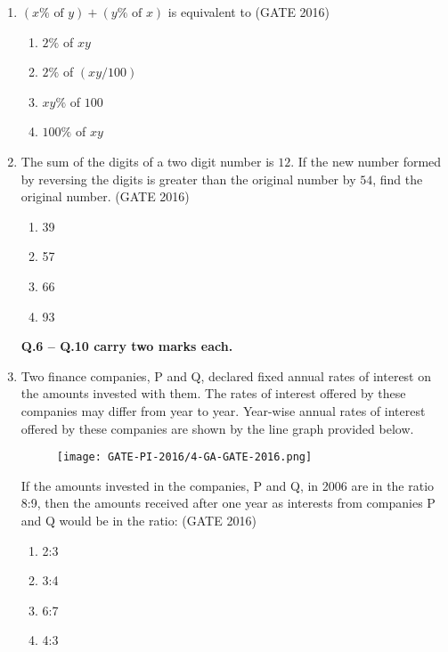 \documentclass[journal,12pt,onecolumn]{IEEEtran}
\theoremstyle{remark}
\begin{document}
\begin{enumerate}
\item $(x\% \text{ of } y) + (y\% \text{ of } x)$ is equivalent to \underline{\hspace{2cm}}  
\hfill{(GATE 2016)}

\begin{enumerate}
    \item $2\%$ of $xy$
    \item $2\%$ of $(xy/100)$
    \item $xy\%$ of $100$
    \item $100\%$ of $xy$
\end{enumerate}
\vspace{1cm}

\item The sum of the digits of a two digit number is $12$. If the new number formed by reversing the digits is greater than the original number by $54$, find the original number.  
\hfill{(GATE 2016)}

\begin{enumerate}
    \item 39
    \item 57
    \item 66
    \item 93
\end{enumerate}
\vspace{1cm}

\textbf{Q.6 -- Q.10 carry two marks each.}



\item Two finance companies, P and Q, declared fixed annual rates of interest on the amounts invested with them. The rates of interest offered by these companies may differ from year to year. Year-wise annual rates of interest offered by these companies are shown by the line graph provided below.  

\begin{figure}[h!]
    \centering
    \texttt{[image: GATE-PI-2016/4-GA-GATE-2016.png]} %
\end{figure}

If the amounts invested in the companies, P and Q, in 2006 are in the ratio 8:9, then the amounts received after one year as interests from companies P and Q would be in the ratio:  
\hfill{(GATE 2016)}

\begin{enumerate}
    \item 2:3
    \item 3:4
    \item 6:7
    \item 4:3
\end{enumerate}
\vspace{1cm}


\end{enumerate}
\end{document}
